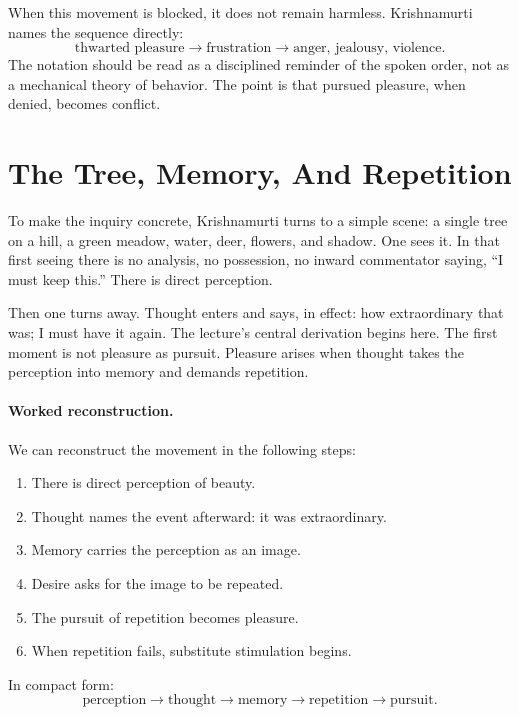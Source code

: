 When this movement is blocked, it does not remain harmless. Krishnamurti names the sequence directly:
\begin{equation}
\text{thwarted pleasure}
\longrightarrow
\text{frustration}
\longrightarrow
\text{anger, jealousy, violence}.
\end{equation}
The notation should be read as a disciplined reminder of the spoken order, not as a mechanical theory of behavior. The point is that pursued pleasure, when denied, becomes conflict.

\section{The Tree, Memory, And Repetition}

To make the inquiry concrete, Krishnamurti turns to a simple scene: a single tree on a hill, a green meadow, water, deer, flowers, and shadow. One sees it. In that first seeing there is no analysis, no possession, no inward commentator saying, ``I must keep this.'' There is direct perception.

Then one turns away. Thought enters and says, in effect: how extraordinary that was; I must have it again. The lecture's central derivation begins here. The first moment is not pleasure as pursuit. Pleasure arises when thought takes the perception into memory and demands repetition.

\paragraph{Worked reconstruction.}
We can reconstruct the movement in the following steps:
\begin{enumerate}
\item There is direct perception of beauty.
\item Thought names the event afterward: it was extraordinary.
\item Memory carries the perception as an image.
\item Desire asks for the image to be repeated.
\item The pursuit of repetition becomes pleasure.
\item When repetition fails, substitute stimulation begins.
\end{enumerate}

In compact form:
\begin{equation}
\text{perception}
\longrightarrow
\text{thought}
\longrightarrow
\text{memory}
\longrightarrow
\text{repetition}
\longrightarrow
\text{pursuit}.
\end{equation}

